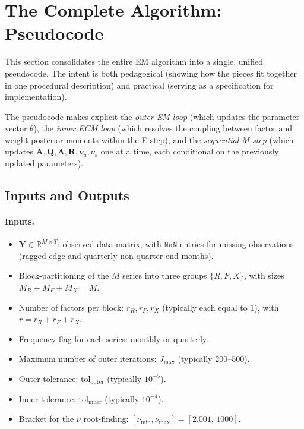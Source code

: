 \documentclass[11pt, a4paper, oneside]{article}
\newcommand{\mL}{\boldsymbol{\Lambda}}
\begin{document}
\newpage

\section{The Complete Algorithm: Pseudocode}
\label{sec:pseudocode}

This section consolidates the entire EM algorithm into a single, unified
pseudocode. The intent is both pedagogical (showing how the pieces fit
together in one procedural description) and practical (serving as a
specification for implementation).

The pseudocode makes explicit the \emph{outer EM loop} (which updates
the parameter vector $\theta$), the \emph{inner ECM loop} (which
resolves the coupling between factor and weight posterior moments
within the E-step), and the \emph{sequential M-step}
(which updates $\mathbf{A}, \mathbf{Q}, \mL, \mathbf{R}, \nu_u, \nu_\varepsilon$ one at a time, each conditional on the
previously updated parameters).

\subsection{Inputs and Outputs}
\label{subsec:algorithm-io}

\paragraph{Inputs.}
\begin{itemize}[leftmargin=1.5em, itemsep=2pt]
    \item $\mathbf{Y} \in \mathbb{R}^{M \times T}$: observed data matrix,
          with $\mathtt{NaN}$ entries for missing observations (ragged
          edge and quarterly non-quarter-end months).
    \item Block-partitioning of the $M$ series into three groups
          $\{R, F, X\}$, with sizes $M_R + M_F + M_X = M$.
    \item Number of factors per block: $r_R, r_F, r_X$ (typically
          each equal to $1$), with $r = r_R + r_F + r_X$.
    \item Frequency flag for each series: monthly or quarterly.
    \item Maximum number of outer iterations: $J_{\max}$ (typically
          200–500).
    \item Outer tolerance: $\mathrm{tol}_{\text{outer}}$ (typically
          $10^{-5}$).
    \item Inner tolerance: $\mathrm{tol}_{\text{inner}}$ (typically
          $10^{-4}$).
    \item Bracket for the $\nu$ root-finding:
          $[\nu_{\min}, \nu_{\max}] = [2.001,\, 1000]$.
\end{itemize}
\end{document}
